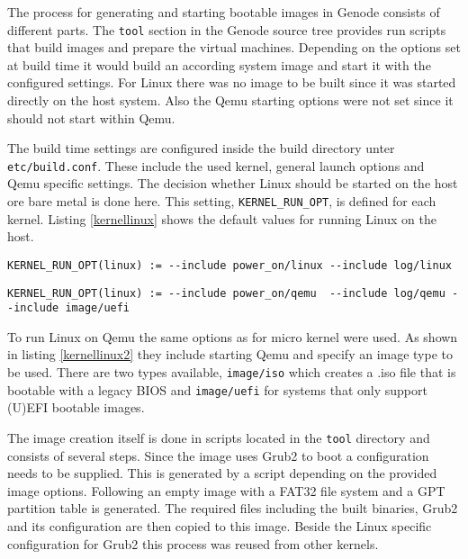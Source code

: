 \documentclass[
a4paper,
12pt,
notitlepage,
parskip=half,
DIV=11,
]{scrbook}
\begin{document}
		The process for generating and starting bootable images in Genode consists of different parts.
		The \texttt{tool} section in the Genode source tree provides run scripts that build images and prepare the virtual machines.
		Depending on the options set at build time it would build an according system image and start it with the configured settings.
		For Linux there was no image to be built since it was started directly on the host system.
		Also the Qemu starting options were not set since it should not start within Qemu. \citep{genode}
		
		The build time settings are configured inside the build directory unter \texttt{etc/build.conf}.
		These include the used kernel, general launch options and Qemu specific settings.
		The decision whether Linux should be started on the host ore bare metal is done here.
		This setting, \texttt{KERNEL\_RUN\_OPT}, is defined for each kernel.
		Listing \ref{kernellinux} shows the default values for running Linux on the host.
		
		\begin{lstlisting}
KERNEL_RUN_OPT(linux) := --include power_on/linux --include log/linux
		\end{lstlisting}
		
		\begin{lstlisting}
KERNEL_RUN_OPT(linux) := --include power_on/qemu  --include log/qemu --include image/uefi
		\end{lstlisting}
		
		To run Linux on Qemu the same options as for micro kernel were used.
		As shown in listing \ref{kernellinux2} they include starting Qemu and specify an image type to be used.
		There are two types available, \texttt{image/iso} which creates a .iso file that is bootable with a legacy BIOS and \texttt{image/uefi} for systems that only support (U)EFI bootable images.
		
		The image creation itself is done in scripts located in the \texttt{tool} directory and consists of several steps.
		Since the image uses Grub2 to boot a configuration needs to be supplied.
		This is generated by a script depending on the provided image options.
		Following an empty image with a FAT32 file system and a GPT partition table is generated.
		The required files including the built binaries, Grub2 and its configuration are then copied to this image.
		Beside the Linux specific configuration for Grub2 this process was reused from other kernels.
		
\end{document}
